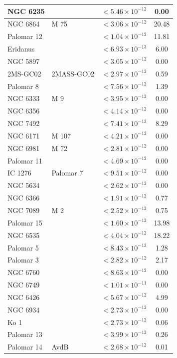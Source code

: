 \begin{longtable}{|l|l|l|c|}
NGC 6235 & & $<5.46\times 10^{-12}$ & 0.00 \\\hline
NGC 6864 & M 75 & $<3.06\times 10^{-12}$ & 20.48 \\\hline
Palomar 12 & & $<1.04\times 10^{-12}$ & 11.81 \\\hline
Eridanus & & $<6.93\times 10^{-13}$ & 6.00 \\\hline
NGC 5897 & & $<3.05\times 10^{-12}$ & 0.00 \\\hline
2MS-GC02 & 2MASS-GC02& $<2.97\times 10^{-12}$ & 0.59 \\\hline
Palomar 8 & & $<7.56\times 10^{-12}$ & 1.39 \\\hline
NGC 6333 & M 9& $<3.95\times 10^{-12}$ & 0.00 \\\hline
NGC 6356 & & $<4.14\times 10^{-12}$ & 0.00 \\\hline
NGC 7492 & & $<7.41\times 10^{-13}$ & 8.29 \\\hline
NGC 6171 &M 107 & $<4.21\times 10^{-12}$ & 0.00 \\\hline
NGC 6981 & M 72& $<2.81\times 10^{-12}$ & 0.00 \\\hline
Palomar 11 & & $<4.69\times 10^{-12}$ & 0.00 \\\hline
IC 1276 & Palomar 7 & $<9.51\times 10^{-12}$ & 0.00 \\\hline
NGC 5634 & & $<2.62\times 10^{-12}$ & 0.00 \\\hline
NGC 6366 & & $<1.91\times 10^{-12}$ & 0.77 \\\hline
NGC 7089 & M 2& $<2.52\times 10^{-12}$ & 0.75 \\\hline
Palomar 15 & & $<1.60\times 10^{-12}$ & 13.98 \\\hline
NGC 6535 & & $<4.04\times 10^{-12}$ & 18.22 \\\hline
Palomar 5 & & $<8.43\times 10^{-13}$ & 1.28 \\\hline
Palomar 3 & & $<2.82\times 10^{-12}$ & 2.17 \\\hline
NGC 6760 & & $<8.63\times 10^{-12}$ & 0.00 \\\hline
NGC 6749 & & $<1.01\times 10^{-11}$ & 0.00 \\\hline
NGC 6426 & & $<5.67\times 10^{-12}$ & 4.99 \\\hline
NGC 6934 & & $<2.73\times 10^{-12}$ & 0.00 \\\hline
Ko 1 & & $<2.73\times 10^{-12}$ & 0.06 \\\hline
Palomar 13 & & $<3.99\times 10^{-12}$ & 0.26 \\\hline
Palomar 14 & AvdB& $<2.68\times 10^{-12}$ & 0.01 \\\hline

\end{longtable}
